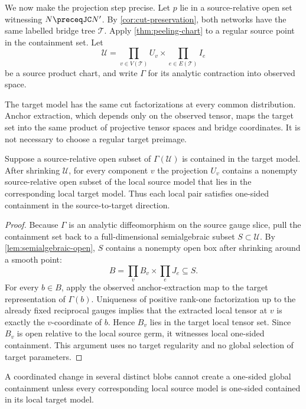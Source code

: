We now make the projection step precise.  Let $p$ lie in a source-relative open set witnessing $N\preceqJC N'$.  By \cref{cor:cut-preservation}, both networks have the same labelled bridge tree $\mathcal T$.  Apply \cref{thm:peeling-chart} to a regular source point in the containment set.  Let
\[
\mathcal U=\prod_{v\in V(\mathcal T)}U_v\times\prod_{e\in E(\mathcal T)}I_e
\]
be a source product chart, and write $\Gamma$ for its analytic contraction into observed space.

The target model has the same cut factorizations at every common distribution.  Anchor extraction, which depends only on the observed tensor, maps the target set into the same product of projective tensor spaces and bridge coordinates.  It is not necessary to choose a regular target preimage.

\begin{proposition}\label{prop:directed-localization}
Suppose a source-relative open subset of $\Gamma(\mathcal U)$ is contained in the target model.  After shrinking $\mathcal U$, for every component $v$ the projection $U_v$ contains a nonempty source-relative open subset of the local source model that lies in the corresponding local target model.  Thus each local pair satisfies one-sided containment in the source-to-target direction.
\end{proposition}

\begin{proof}
Because $\Gamma$ is an analytic diffeomorphism on the source gauge slice, pull the containment set back to a full-dimensional semialgebraic subset $S\subset\mathcal U$.  By \cref{lem:semialgebraic-open}, $S$ contains a nonempty open box after shrinking around a smooth point:
\[
B=\prod_v B_v\times\prod_e J_e\subseteq S.
\]
For every $b\in B$, apply the observed anchor-extraction map to the target representation of $\Gamma(b)$.  Uniqueness of positive rank-one factorization up to the already fixed reciprocal gauges implies that the extracted local tensor at $v$ is exactly the $v$-coordinate of $b$.  Hence $B_v$ lies in the target local tensor set.  Since $B_v$ is open relative to the local source germ, it witnesses local one-sided containment.  This argument uses no target regularity and no global selection of target parameters.
\end{proof}

\begin{corollary}\label{cor:no-compensation}
A coordinated change in several distinct blobs cannot create a one-sided global containment unless every corresponding local source model is one-sided contained in its local target model.
\end{corollary}

